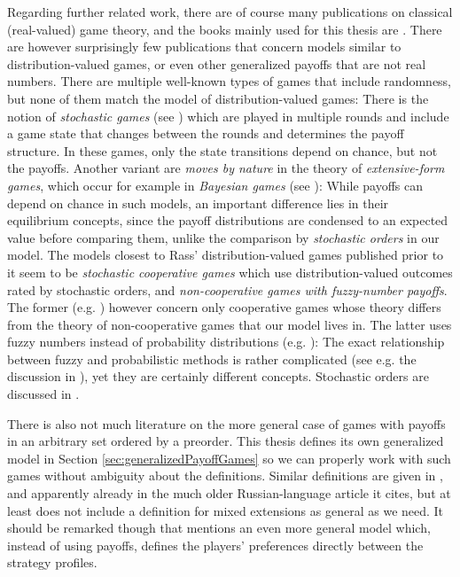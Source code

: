 \documentclass[a4paper,DIV=11]{scrreprt}
\theoremstyle{definition}
\begin{document}
    Regarding further related work, there are of course many publications on classical (real-valued) game theory, and the books mainly used for this thesis are \cites{bib:fudenbergGameTheory,bib:nisanAlgorithmicGameTheory,bib:matsumotoGameTheory}.
    There are however surprisingly few publications that concern models similar to distribution-valued games, or even other generalized payoffs that are not real numbers. There are multiple well-known types of games that include randomness, but none of them match the model of distribution-valued games: 
    There is the notion of \emph{stochastic games} (see \cite{bib:shapleyStochasticGames}) which are played in multiple rounds and include a game state that changes between the rounds and determines the payoff structure. In these games, only the state transitions depend on chance, but not the payoffs. 
    Another variant are \emph{moves by nature} in the theory of \emph{extensive-form games}, which occur for example in \emph{Bayesian games} (see \cite[Chapter 6 and Section 8.3]{bib:fudenbergGameTheory}): While payoffs can depend on chance in such models, an important difference lies in their equilibrium concepts, since the payoff distributions are condensed to an expected value before comparing them, unlike the comparison by \emph{stochastic orders} in our model. 
    The models closest to Rass' distribution-valued games published prior to it seem to be \emph{stochastic cooperative games} which use distribution-valued outcomes rated by stochastic orders, and \emph{non-cooperative games with fuzzy-number payoffs}. 
    The former (e.g. \cite{bib:suijsCooperativeGamesWithStochasticPayoffs,bib:fernandezCoresOfStochasticCoopGamesWithStochasticOrders}) however concern only cooperative games whose theory differs from the theory of non-cooperative games that our model lives in. 
    The latter uses fuzzy numbers instead of probability distributions (e.g. \cite{bib:maedaCharacterizationOfEquilibriumFuzzyPayoff, bib:cevikelSolutionsFuzzyMatrixGames}): The exact relationship between fuzzy and probabilistic methods is rather complicated (see e.g. the discussion in \cite{bib:kandelDistinctionBetweenFuzzyAndStatisticalMethods}), yet they are certainly different concepts.
    Stochastic orders are discussed in \cite{bib:shakedStochasticOrders}.
    
    There is also not much literature on the more general case of games with payoffs in an arbitrary set ordered by a preorder.
    This thesis defines its own generalized model in Section \ref{sec:generalizedPayoffGames} so we can properly work with such games without ambiguity about the definitions. Similar definitions are given in \cite{bib:rozenEquilibriaInGamesWithOrderedOutcomes}, and apparently already in the much older Russian-language article \cite{bib:vorobevThePresentStateOfGameTheory} it cites, but at least \cite{bib:rozenEquilibriaInGamesWithOrderedOutcomes} does not include a definition for mixed extensions as general as we need.
    It should be remarked though that \cite[Section 1.2.1]{bib:nisanAlgorithmicGameTheoryCh1Basic} mentions an even more general model which, instead of using payoffs, defines the players' preferences directly between the strategy profiles.
    
\end{document}
